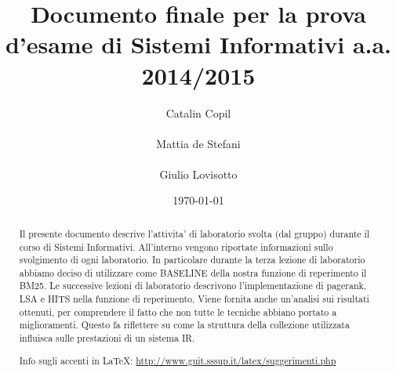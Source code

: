 \documentclass{llncs}
\begin{document}
\title{Documento finale per la prova d'esame di Sistemi Informativi
  a.a. 2014/2015} 
\author{
	Catalin Copil\\\\ 
	Mattia de Stefani\\\\ 
	Giulio Lovisotto\\} 
\institute{}

\date{\today}

\maketitle
\begin{abstract}
Il presente documento descrive l'attivita' di laboratorio svolta (dal gruppo) durante il corso di Sistemi Informativi. 
All'interno vengono riportate informazioni sullo svolgimento di ogni laboratorio. In particolare durante la terza lezione di laboratorio abbiamo deciso di utilizzare come BASELINE della nostra funzione di reperimento il BM25. Le successive lezioni di laboratorio descrivono l'implementazione di pagerank, LSA e HITS nella funzione di reperimento. 
Viene fornita anche un'analisi sui risultati ottenuti, per comprendere il fatto che non tutte le tecniche abbiano portato a miglioramenti. Questo fa riflettere su come la struttura della collezione utilizzata influisca sulle prestazioni di un sistema IR.


Info sugli accenti in \LaTeX : \underline{http://www.guit.sssup.it/latex/suggerimenti.php} 
	
	
\end{abstract}
\end{document}
